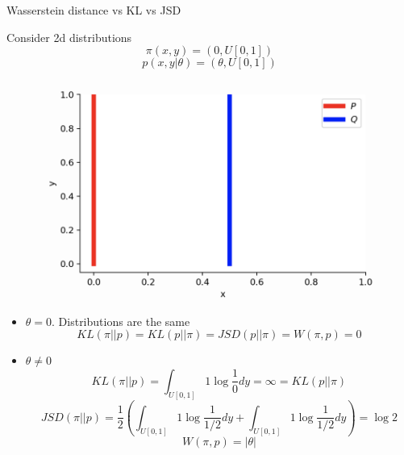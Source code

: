 \begin{frame}{Wasserstein distance vs KL vs JSD}
	
	\begin{minipage}[t]{0.48\columnwidth}
		\vspace{0.1cm}
		Consider 2d distributions
		\[
		\pi(x, y) = (0, U[0,1])
		\]	
		\[
		p(x, y | \theta) = (\theta, U[0, 1])
		\]
	\end{minipage}%
	\begin{minipage}[t]{0.52\columnwidth}
		\begin{figure}
			\centering
			\includegraphics[width=0.8\linewidth]{figs/w_kl_jsd}
		\end{figure}
	\end{minipage}
	\begin{itemize}
		\footnotesize
		\item $\theta = 0$.
		Distributions are the same 
		\[
		KL(\pi || p) = KL(p || \pi) = JSD(p || \pi) = W(\pi, p) = 0
		\]
		\item $\theta \neq 0$
		\[
		KL(\pi || p) = \int_{U[0, 1]} 1 \log \frac{1}{0} d y = \infty = KL(p || \pi)
		\]
		\[
		JSD(\pi || p) = \frac{1}{2}\left( \int_{U[0, 1]}1 \log \frac{1}{1/2} dy + \int_{U[0, 1]}1 \log \frac{1}{1/2} dy \right) = \log 2
		\]
		\[
		W(\pi, p) = |\theta|
		\]
	\end{itemize}
	
\end{frame}
